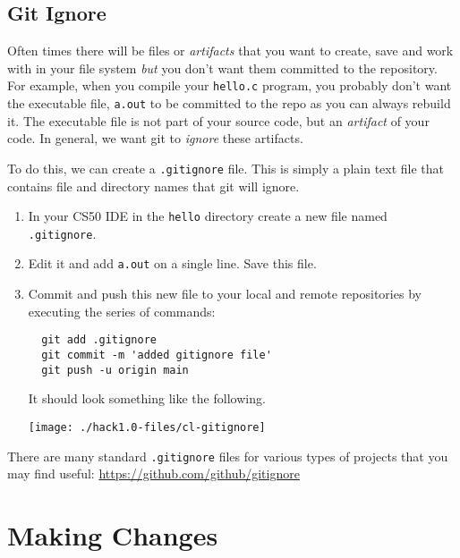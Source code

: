 \documentclass[12pt]{scrartcl}
\begin{document}
\subsection{Git Ignore}

Often times there will be files or \emph{artifacts} that you want 
to create, save and work with in your file system \emph{but} you 
don't want them committed to the repository.  For example, when
you compile your \texttt{hello.c} program, you probably
don't want the executable file, \texttt{a.out} to be
committed to the repo as you can always rebuild it.  The executable
file is not part of your source code, but an \emph{artifact} of your 
code.  In general, we want git to \emph{ignore} these artifacts.

To do this, we can create a \texttt{.gitignore} file.  This
is simply a plain text file that contains file and directory names 
that git will ignore.  

\begin{enumerate}
  \item In your CS50 IDE in the \texttt{hello} directory
  create a new file named \texttt{.gitignore}.  

  \item Edit it and add \texttt{a.out} on a single line.
  Save this file.
  
  \item Commit and push this new file to your local and remote
  repositories by executing the series of commands:
  
  \begin{verbatim}
  git add .gitignore
  git commit -m 'added gitignore file'
  git push -u origin main
  \end{verbatim}
  
  It should look something like the following.
  
  \begin{center}
  \texttt{[image: ./hack1.0-files/cl-gitignore]}
  \end{center}
  
\end{enumerate}

There are many standard \texttt{.gitignore} files for
various types of projects that you may find useful: 
\url{https://github.com/github/gitignore}

\section{Making Changes}
\end{document}
